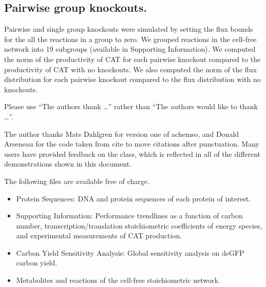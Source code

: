 \documentclass[journal=asbcd6,manuscript=article]{achemso}
\begin{document}
\subsection*{Pairwise group knockouts.}
Pairwise and single group knockouts were simulated by setting the flux bounds for the all the reactions in a group to zero.
We grouped reactions in the cell-free network into 19 subgroups (available in Supporting Information).
We computed the norm of the productivity of CAT for each pairwise knockout compared to the productivity of CAT with no knockouts.
We also computed the norm of the flux distribution for each pairwise knockout compared to the flux distribution with no knockouts.
\begin{acknowledgement}

Please use ``The authors thank \ldots'' rather than ``The
authors would like to thank \ldots''.

The author thanks Mats Dahlgren for version one of \textsf{achemso},
and Donald Arseneau for the code taken from \textsf{cite} to move
citations after punctuation. Many users have provided feedback on the
class, which is reflected in all of the different demonstrations
shown in this document.

\end{acknowledgement}

\begin{suppinfo}
The following files are available free of charge.
\begin{itemize}
  \item Protein Sequences: DNA and protein sequences of each protein of interest.
  \item Supporting Information: Performance trendlines as a function of carbon number, transcription/translation stoichiometric coefficients of energy species, and experimental measurements of CAT production.
  \item Carbon Yield Sensitivity Analysis: Global sensitivity analysis on deGFP carbon yield.
  \item Metabolites and reactions of the cell-free stoichiometric network.
\end{itemize}
\end{suppinfo}

\clearpage


\end{document}
